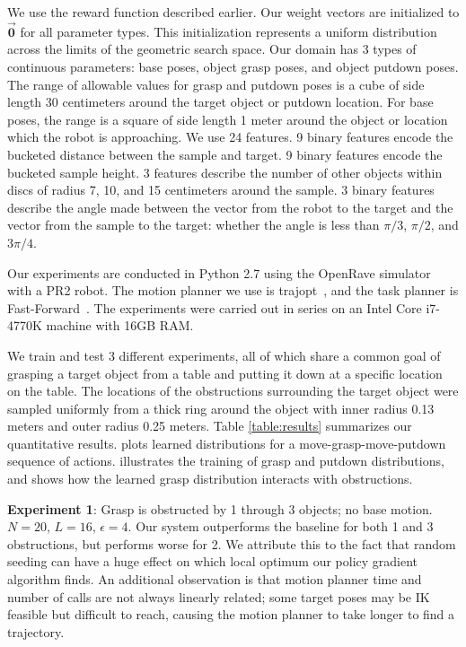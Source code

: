 We use the reward function described earlier. Our weight
vectors are initialized to $\vec{\mathbf{0}}$ for all parameter types.
This initialization represents a uniform distribution across the limits of the geometric search space.
Our domain has 3 types of continuous parameters: base poses, object grasp poses, and object putdown poses.
The range of allowable values for grasp and putdown poses is a cube of side length 30 centimeters
around the target object or putdown location. For base poses, the range is a
square of side length 1 meter around the object or location which the robot is approaching.
We use 24 features. 9 binary features encode the bucketed distance between the sample
and target. 9 binary features encode the bucketed sample height. 3 features
describe the number of other objects within discs of radius 7, 10, and 15 centimeters around the
sample. 3 binary features describe the angle made between the vector from the
robot to the target and the vector from the sample to the target: whether the angle is less than
$\pi/3$, $\pi/2$, and $3\pi/4$.

Our experiments are conducted in Python 2.7 using the OpenRave simulator~\cite{Diankov_2008_6117} with a PR2 robot.
The motion planner we use is trajopt~\cite{schulman2013finding}, and the task planner is Fast-Forward~\cite{FF}.
The experiments were carried out in series on an Intel Core i7-4770K machine
with 16GB RAM.

We train and test 3 different experiments, all of which share a common goal of
grasping a target object from a table and putting it down at a specific location on the table.
The locations of the obstructions surrounding the target object were
sampled uniformly from a thick ring around the object with inner radius 0.13 meters
and outer radius 0.25 meters. Table \ref{table:results} summarizes our quantitative results.
 plots learned distributions for a move-grasp-move-putdown sequence of actions.
 illustrates the training of grasp and putdown distributions, and 
shows how the learned grasp distribution interacts with obstructions.

\textbf{Experiment 1}: Grasp is obstructed by 1 through 3 objects; no base motion.
$N = 20$, $L = 16$, $\epsilon = 4$. Our system outperforms the baseline for both 1 and 3
obstructions, but performs worse for 2. We attribute this to the fact that random seeding can
have a huge effect on which local optimum our policy gradient algorithm finds. An additional
observation is that motion planner time and number of calls are not always linearly related; some target
poses may be IK feasible but difficult to reach, causing the motion planner to take longer
to find a trajectory.

